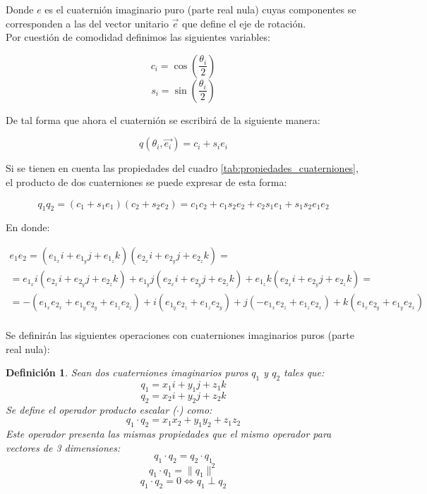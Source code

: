 \documentclass[12pt, a4paper]{report}
\newtheorem{defn}{Definición}[section]
\begin{document}
Donde $e$ es el cuaternión imaginario puro (parte real nula) cuyas componentes se corresponden a las del vector unitario $\vec{e}$ que define el eje de rotación. \\

Por cuestión de comodidad definimos las siguientes variables:

\begin{equation}
c_i = \cos \left( \frac{\theta_i}{2} \right)
\end{equation}
\begin{equation}
s_i = \sin \left( \frac{\theta_i}{2} \right)
\end{equation}

De tal forma que ahora el cuaternión se escribirá de la siguiente manera:

\begin{equation} \label{eq: q_theta_e}
q(\theta_i, \vec{e_i}) = c_i + s_i e_i
\end{equation}

Si se tienen en cuenta las propiedades del cuadro \ref{tab:propiedades_cuaterniones}, el producto de dos cuaterniones se puede expresar de esta forma:

\begin{equation} \label{eq: E11}
q_1 q_2 = \left( c_1 + s_1 e_1 \right) \left( c_2 + s_2 e_2 \right) = c_1 c_2 + c_1 s_2 e_2 + c_2 s_1 e_1 + s_1 s_2 e_1 e_2
\end{equation}

En donde:

\begin{multline} \label{eq: E10}
e_1 e_2 = (e_{1_x} i + e_{1_y} j + e_{1_z} k)(e_{2_x} i + e_{2_y} j + e_{2_z} k) = \\
= e_{1_x} i (e_{2_x} i + e_{2_y} j + e_{2_z} k) + e_{1_y} j (e_{2_x} i + e_{2_y} j + e_{2_z} k) + e_{1_z} k (e_{2_x} i + e_{2_y} j + e_{2_z} k) = \\
= -(e_{1_x} e_{2_x} + e_{1_y} e_{2_y} + e_{1_z} e_{2_z}) + i (e_{1_y} e_{2_z} + e_{1_z} e_{2_y}) + j (-e_{1_x} e_{2_z} + e_{1_z} e_{2_x}) + k (e_{1_x} e_{2_y} + e_{1_y} e_{2_x}) \\
\end{multline}

Se definirán las siguientes operaciones con cuaterniones imaginarios puros (parte real nula):

\begin{defn}
Sean dos cuaterniones imaginarios puros $q_1$ y $q_2$ tales que:
$$ q_1 = x_1i + y_1j + z_1k $$
$$ q_2 = x_2i + y_2j + z_2k $$
Se define el operador producto escalar ($\cdot$) como:
$$ q_1 \cdot q_2 = x_1x_2 + y_1y_2 + z_1z_2 $$
Este operador presenta las mismas propiedades que el mismo operador para vectores de 3 dimensiones:
$$ q_1 \cdot q_2 = q_2 \cdot q_1 $$
$$ q_1 \cdot q_1 = \|q_1\|^2 $$
$$ q_1 \cdot q_2 = 0 \iff q_1 \perp q_2 $$
\end{defn}
\end{document}
